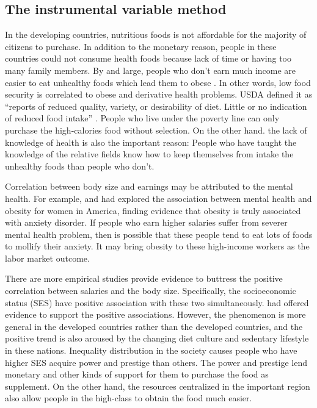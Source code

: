\documentclass{article}
\begin{document}
\subsection*{The instrumental variable method}
In the developing countries, nutritious foods is not affordable for the majority of citizens to purchase. In addition to the monetary reason, people in these countries could not consume health foods because lack of time or having too many family members. By and large, people who don't earn much income are easier to eat unhealthy foods which lead them to obese \citep{mullan2017s}. In other words, low food security is correlated to obese and derivative health problems. USDA defined it as “reports of reduced quality, variety, or desirability of diet. Little or no indication of reduced food intake” \citep{dhurandhar2016food}. People who live under the poverty line can only purchase the high-calories food without selection. On the other hand. the lack of knowledge of health is also the important reason: People who have taught the knowledge of the relative fields know how to keep themselves from intake the unhealthy foods than people who don't.
\par
\setlength{\parindent}{2em}
Correlation between body size and earnings may be attributed to the mental health. For example, \citet{carpenter2000relationships} and \citet{onyike2003obesity} had explored the association between mental health and obesity for women in America, finding evidence that obesity is truly associated with anxiety disorder. If people who earn higher salaries suffer from severer mental health problem, then is possible that these people tend to eat lots of foods to mollify their anxiety. It may bring obesity to these high-income workers as the labor market outcome.
\par
\setlength{\parindent}{2em}
There are more empirical studies provide evidence to buttress the positive correlation between salaries and the body size. Specifically, the socioeconomic status (SES) have positive association with these two simultaneously. \citet{nguyen2007trends,dinsa2012obesity,minh2007risk} had offered evidence to support the positive associations. However, the phenomenon is more general in the developed countries rather than the developed countries, and the positive trend is also aroused by the changing diet culture and sedentary lifestyle in these nations. Inequality distribution in the society causes people who have higher SES acquire power and prestige than others. The power and prestige lend monetary and other kinds of support for them to purchase the food as supplement. On the other hand, the resources centralized in the important region also allow people in the high-class to obtain the food much easier.    
\end{document}
